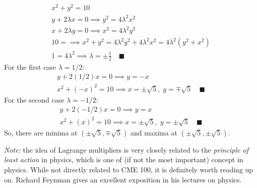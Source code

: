 \documentclass[letterpaper, 11pt]{article}
\begin{document}
\begin{gather*}
x^2 + y^2 = 10 \\
y + 2\lambda x = 0 \implies  y^2 =  4 \lambda^2 x^2 \\
 x + 2 \lambda y = 0 \implies x^2 = 4\lambda^2 y^2 \\
10 =  \implies x^2 + y^2 = 4\lambda^2 y^2 + 4 \lambda^2 x^2 = 4\lambda^2 (y^2 + x^2)\\
1 = 4 \lambda^2 \implies \lambda = \pm \frac{1}{2} \quad\blacksquare
\end{gather*}
For the first case $\lambda = 1/2$:
\begin{gather*}
y + 2(1/2) x = 0 \implies y = -x\\
x^2 + (-x)^2 = 10 \implies x = \pm \sqrt{5},\; y = \mp \sqrt{5} \quad\blacksquare
\end{gather*}
For the second case $\lambda = -1/2$:
\begin{gather*}
y + 2(-1/2) x = 0 \implies y = x\\
x^2 + (x)^2 = 10 \implies x = \pm \sqrt{5},\; y = \pm \sqrt{5} \quad\blacksquare
\end{gather*}
So, there are minima at $(\pm \sqrt{5}, \mp \sqrt{5})$ and maxima at $(\pm \sqrt{5}, \pm \sqrt{5})$. 

\par \textit{Note:} the idea of Lagrange multipliers is very closely related to the \textit{principle of least action} in physics, which is one of (if not the most important) concept in physics. While not directly related to CME 100, it is definitely worth reading up on. Richard Feynman gives an excellent exposition in his lectures on physics. 
\end{document}
